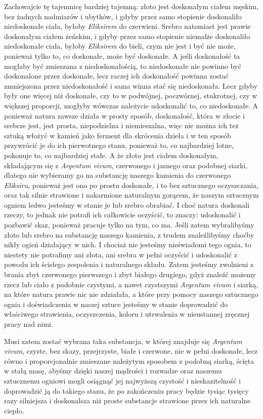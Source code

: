 Zachowajcie tę tajemnicę bardziej tajemną: złoto jest doskonałym ciałem męskim, bez żadnych nadmiarów i ubytków, i gdyby przez samo stopienie doskonaliło niedoskonałe ciała, byłoby \textit{Eliksirem} do czerwieni. Srebro natomiast jest prawie doskonałym ciałem żeńskim, i gdyby przez samo stopienie niemalże doskonaliło niedoskonałe ciała, byłoby \textit{Eliksirem} do bieli, czym nie jest i być nie może, ponieważ tylko to, co doskonałe, może być doskonałe. A jeśli doskonałość ta mogłaby być zmieszana z niedoskonałością, to niedoskonałe nie powinno być doskonalone przez doskonałe, lecz raczej ich doskonałość powinna zostać zmniejszona przez niedoskonałość i sama winna stać się niedoskonała. Lecz gdyby były one więcej niż doskonałe, czy to w podwójnej, poczwórnej, stukrotnej, czy w większej proporcji, mogłyby wówczas należycie udoskonalić to, co niedoskonałe. A ponieważ natura zawsze działa w prosty sposób, doskonałość, która w złocie i srebrze jest, jest prosta, niepodzielna i niemieszalna, więc nie można ich też sztuką włożyć w kamień jako ferment dla skrócenia dzieła i w ten sposób przywrócić je do ich pierwotnego stanu, ponieważ to, co najbardziej lotne, pokonuje to, co najbardziej stałe. A że złoto jest ciałem doskonałym, składającym się z \textit{Argentum vivum}, czerwonego i jasnego oraz podobnej siarki, dlatego nie wybieramy go na substancję naszego kamienia do czerwonego \textit{Eliksiru}, ponieważ jest ono po prostu doskonałe, i to bez sztucznego oczyszczania, oraz tak silnie strawione i nakarmione naturalnym gorącem, że naszym sztucznym ogniem ledwo jesteśmy w stanie je lub srebro obrabiać. I choć natura doskonali rzeczy, to jednak nie potrafi ich całkowicie oczyścić, to znaczy: udoskonalić i pozbawić skaz, ponieważ pracuje tylko na tym, co ma. Jeśli zatem wybralibyśmy złoto lub srebro na substancję naszego kamienia, z trudem znaleźlibyśmy choćby nikły ogień działający w nich. I chociaż nie jesteśmy nieświadomi tego ognia, to niestety nie potrafimy ani złota, ani srebra w pełni oczyścić i udoskonalić z powodu ich ścisłego zespolenia i naturalnego składu. Zatem jesteśmy zwolnieni z brania zbyt czerwonego pierwszego i zbyt białego drugiego, gdyż znaleźć możemy rzecz lub ciało z podobnie czystymi, a nawet czystszymi \textit{Argentum vivum} i siarką, na które natura prawie nic nie zdziałała, a które przy pomocy naszego sztucznego ognia i doświadczenia w naszej sztuce jesteśmy w stanie doprowadzić do właściwego strawienia, oczyszczenia, koloru i utrwalenia w nieustannej zręcznej pracy nad nimi. 

Musi zatem zostać wybrana taka substancja, w której znajduje się \textit{Argentum vivum}, czyste, bez skazy, przejrzyste, białe i czerwone, nie w pełni doskonałe, lecz równo i proporcjonalnie zmieszane należytym sposobem z podobną siarką, ścięta w stałą masę, abyśmy dzięki naszej mądrości i rozwadze oraz naszemu sztucznemu ogniowi mogli osiągnąć jej najwyższą czystość i nieskazitelność i doprowadzić ją do takiego stanu, że po zakończeniu pracy będzie tysiąc tysięcy razy silniejsza i doskonalsza niż proste substancje strawione przez ich naturalne ciepło. 


